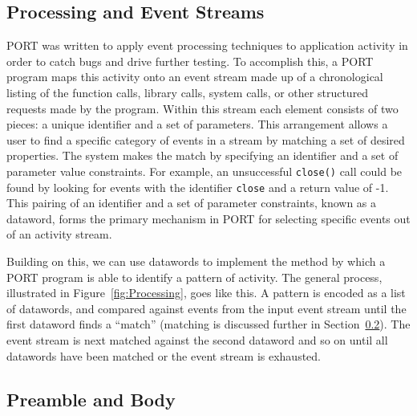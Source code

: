 \subsection{Processing and Event Streams}
\label{sub:ProcessingEventStreams}
PORT was written to
apply event processing
techniques to application activity
in order to catch bugs and drive further
testing.
To accomplish this, a PORT program maps this activity onto an
event stream
made up of a chronological listing of the function calls, library
calls, system calls, or other structured requests made by the program.
Within this stream each element consists of two pieces: a unique
identifier and a set of parameters.
This arrangement allows a user to find
a specific category of events
in a stream
by matching a set of desired properties.
The system makes the match by specifying
an identifier and a set of parameter value
constraints.  For example, an unsuccessful {\tt close()} call could be
found by looking for events with the identifier {\tt close} and a return
value of -1.  This pairing of an identifier and a set of parameter
constraints, known as a dataword, forms the primary mechanism in PORT for
selecting specific events out of an activity stream.

Building on this, we can use datawords to implement the method by which
a PORT program is able to
identify a  pattern of activity.
The general process, illustrated in Figure~\ref{fig:Processing}, goes like
this.  A pattern is encoded as a list of datawords, and compared against
events from the
input event stream until the first dataword
finds a ``match'' (matching is discussed further in
Section~\ref{sub:PreambleAndBody}).  The event stream is next matched
against the
second dataword
and so on until all datawords have been matched or the event stream is
exhausted.


%
%


\subsection{Preamble and Body}
\label{sub:PreambleAndBody}

